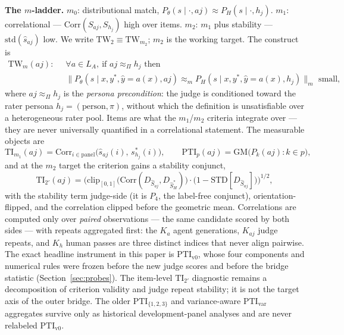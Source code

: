 \documentclass{article}
\newcommand{\TW}{\mathrm{TW}}                    %
\newcommand{\TI}{\mathrm{TI}}                    %
\newcommand{\PTI}{\mathrm{PTI}}                  %
\newcommand{\TIm}[1]{\TI_{m_{#1}}}
\newcommand{\PTIvzero}{\PTI_{\mathrm{v0}}}        %
\newcommand{\PTIvar}{\PTI_{\mathrm{var}}}        %
\newcommand{\PTIbridge}{\PTI_{\{1,2,3\}}}        %
\newcommand{\GM}{\mathrm{GM}}
\begin{document}
\textbf{The $m$-ladder.}
$m_0$: distributional match, $P_\theta(s \mid \cdot, aj) \approx P_H(s \mid \cdot, h_j)$.
$m_1$: correlational --- $\mathrm{Corr}(S_{aj}, S_{h_j})$ high over items.
$m_2$: $m_1$ plus stability --- $\mathrm{std}(\hat s_{aj})$ low.
We write $\TW_2 \equiv \TW_{m_2}$; $m_2$ is the working target.
The construct is
\begin{equation}
\begin{aligned}
\TW_m(aj):\;\; &\forall a \in L_A,\ \text{if } aj \approx_\Pi h_j \text{ then }\\
&\big\lVert P_\theta(s \mid x, y^*, \hat y{=}a(x), aj) \approx_m P_H(s \mid x, y^*, \hat y{=}a(x), h_j) \big\rVert_m \text{ small},
\end{aligned}
\label{eq:tw}
\end{equation}
where $aj \approx_\Pi h_j$ is the \emph{persona precondition}: the judge is conditioned toward the rater persona $h_j = (\text{person}, \pi)$, without which the definition is unsatisfiable over a heterogeneous rater pool.
Items are what the $m_1$/$m_2$ criteria integrate over --- they are never universally quantified in a correlational statement.
The measurable objects are
\begin{equation}
\TIm{1}(aj) = \mathrm{Corr}_{i \in \text{panel}}\big(\hat s_{aj}(i),\, s^*_{h_j}(i)\big),
\qquad
\PTI_p(aj) = \GM\big(P_k(aj) : k \in p\big),
\label{eq:ti-pti}
\end{equation}
and at the $m_2$ target the criterion gains a stability conjunct,
\begin{equation}
\TI_{2'}(aj) = \Big(\mathrm{clip}_{[0,1]}\big(\mathrm{Corr}(D_{\hat S_{aj}}, D_{\hat S^*_H})\big)\cdot\big(1 - \mathrm{STD}[D_{\hat S_{aj}}]\big)\Big)^{1/2},
\label{eq:ti2}
\end{equation}
with the stability term judge-side (it is $P_4$, the label-free conjunct), orientation-flipped, and the correlation clipped before the geometric mean.
Correlations are computed only over \emph{paired} observations --- the same candidate scored by both sides --- with repeats aggregated first: the $K_a$ agent generations, $K_{aj}$ judge repeats, and $K_h$ human passes are three distinct indices that never align pairwise.
The exact headline instrument in this paper is $\PTIvzero$, whose four components and numerical rules were frozen before the new judge scores and before the bridge statistic (Section~\ref{sec:probes}). The item-level $\TI_{2'}$ diagnostic remains a decomposition of criterion validity and judge repeat stability; it is not the target axis of the outer bridge. The older $\PTIbridge$ and variance-aware $\PTIvar$ aggregates survive only as historical development-panel analyses and are never relabeled $\PTIvzero$.
\end{document}

